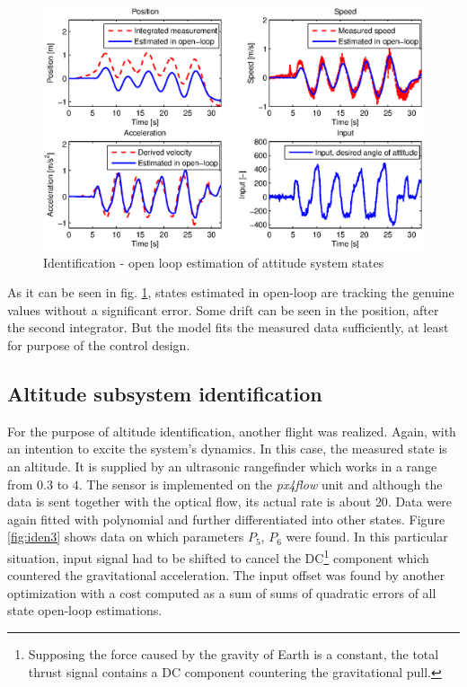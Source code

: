 \begin{figure}[h]
\includegraphics[width=1\textwidth]{fig/iden2.eps} 
\caption{Identification - open loop estimation of attitude system states}
\label{fig:iden2}
\end{figure}

As it can be seen in fig. \ref{fig:iden2}, states estimated in open-loop are tracking the genuine values without a significant error. Some drift can be seen in the position, after the second integrator. But the model fits the measured data sufficiently, at least for purpose of the control design. 

\subsection{Altitude subsystem identification}

For the purpose of altitude identification, another flight was realized. Again, with an intention to excite the system's dynamics. In this case, the measured state is an altitude. It is supplied by an ultrasonic rangefinder which works in a range from $0.3$ to $4$. The sensor is implemented on the \emph{px4flow} unit and although the data is sent together with the optical flow, its actual rate is about $20$. Data were again fitted with polynomial and further differentiated into other states. Figure \ref{fig:iden3} shows data on which parameters $P_5$, $P_6$ were found. In this particular situation, input signal had to be shifted to cancel the DC\footnote{Supposing the force caused by the gravity of Earth is a constant, the total thrust signal contains a DC component countering the gravitational pull.} component which countered the gravitational acceleration. The input offset was found by another optimization with a cost computed as a sum of sums of quadratic errors of all state open-loop estimations.


